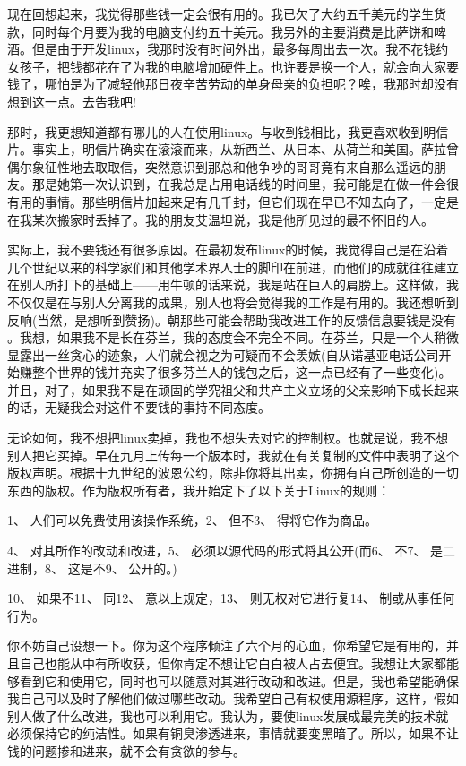 现在回想起来，我觉得那些钱一定会很有用的。我已欠了大约五千美元的学生货款，同时每个月要为我的电脑支付约五十美元。我另外的主要消费是比萨饼和啤酒。但是由于开发linux，我那时没有时间外出，最多每周出去一次。我不花钱约女孩子，把钱都花在了为我的电脑增加硬件上。也许要是换一个人，就会向大家要钱了，哪怕是为了减轻他那日夜辛苦劳动的单身母亲的负担呢？唉，我那时却没有想到这一点。去告我吧!

那时，我更想知道都有哪儿的人在使用linux。与收到钱相比，我更喜欢收到明信片。事实上，明信片确实在滚滚而来，从新西兰、从日本、从荷兰和美国。萨拉曾偶尔象征性地去取取信，突然意识到那总和他争吵的哥哥竟有来自那么遥远的朋友。那是她第一次认识到，在我总是占用电话线的时间里，我可能是在做一件会很有用的事情。那些明信片加起来足有几千封，但它们现在早已不知去向了，一定是在我某次搬家时丢掉了。我的朋友艾温坦说，我是他所见过的最不怀旧的人。

实际上，我不要钱还有很多原因。在最初发布linux的时候，我觉得自己是在沿着几个世纪以来的科学家们和其他学术界人士的脚印在前进，而他们的成就往往建立在别人所打下的基础上——用牛顿的话来说，我是站在巨人的肩膀上。这样做，我不仅仅是在与别人分离我的成果，别人也将会觉得我的工作是有用的。我还想听到反响(当然，是想听到赞扬)。朝那些可能会帮助我改进工作的反馈信息要钱是没有 。我想，如果我不是长在芬兰，我的态度会不完全不同。在芬兰，只是一个人稍微显露出一丝贪心的迹象，人们就会视之为可疑而不会羡嫉(自从诺基亚电话公司开始赚整个世界的钱并充实了很多芬兰人的钱包之后，这一点已经有了一些变化)。并且，对了，如果我不是在顽固的学究祖父和共产主义立场的父亲影响下成长起来的话，无疑我会对这件不要钱的事持不同态度。

无论如何，我不想把linux卖掉，我也不想失去对它的控制权。也就是说，我不想别人把它买掉。早在九月上传每一个版本时，我就在有关复制的文件中表明了这个版权声明。根据十九世纪的波恩公约，除非你将其出卖，你拥有自己所创造的一切东西的版权。作为版权所有者，我开始定下了以下关于Linux的规则：

1、 人们可以免费使用该操作系统，2、 但不3、 得将它作为商品。

4、 对其所作的改动和改进，5、 必须以源代码的形式将其公开(而6、 不7、 是二进制，8、 这是不9、 公开的。)

10、 如果不11、 同12、 意以上规定，13、 则无权对它进行复14、 制或从事任何行为。

你不妨自己设想一下。你为这个程序倾注了六个月的心血，你希望它是有用的，并且自己也能从中有所收获，但你肯定不想让它白白被人占去便宜。我想让大家都能够看到它和使用它，同时也可以随意对其进行改动和改进。但是，我也希望能确保我自己可以及时了解他们做过哪些改动。我希望自己有权使用源程序，这样，假如别人做了什么改进，我也可以利用它。我认为，要使linux发展成最完美的技术就必须保持它的纯洁性。如果有铜臭渗透进来，事情就要变黑暗了。所以，如果不让钱的问题掺和进来，就不会有贪欲的参与。


